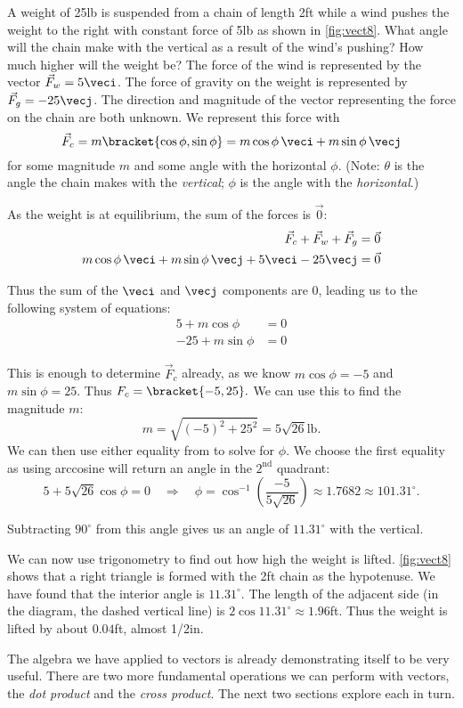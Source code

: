 \begin{example}\label{ex_vect8}
A weight of 25lb is suspended from a chain of length 2ft while a wind pushes the weight to the right with constant force of 5lb as shown in \autoref{fig:vect8}. What angle will the chain make with the vertical as a result of the wind's pushing? How much higher will the weight be?
\solution
The force of the wind is represented by the vector $\vec F_w = 5\veci$. The force of gravity on the weight is represented by $\vec F_g = -25\vecj$. The direction and magnitude of the vector representing the force on the chain are both unknown. We represent this force with
\[\vec F_c = m\bracket{\cos\phi,\sin\phi}= m\cos\phi\, \veci + m\sin\phi\,\vecj\]
for some magnitude $m$ and some angle with the horizontal $\phi$. (Note: $\theta$ is the angle the chain makes with the \emph{vertical}; $\phi$ is the angle with the \emph{horizontal}.)

As the weight is at equilibrium, the sum of the forces is $\vec0$:
\begin{align*}
\vec F_c + \vec F_w + \vec F_g &= \vec 0\\
m\cos\phi\, \veci + m\sin\phi\,\vecj + 5\veci - 25\vecj &=\vec 0
\end{align*}

Thus the sum of the $\veci$ and $\vecj$ components are 0, leading us to the following system of equations:
\begin{align}
5+m\cos\phi &= 0\\
-25+m\sin\phi &= 0
\label{eq:vect8}
\end{align}

This is enough to determine $\vec F_c$ already, as we know $m\cos \phi = -5$ and $m\sin\phi =25$. Thus $F_c =\bracket{-5,25}.$ We can use this to find the magnitude $m$:
\[m = \sqrt{(-5)^2+25^2} = 5\sqrt{26}%
\text{lb}.\]
We can then use either equality from  to solve for $\phi$. We choose the first equality as using arccosine will return an angle in the $2^\text{nd}$ quadrant:
\[5 + 5\sqrt{26}\cos \phi = 0 \quad \Rightarrow \quad \phi = \cos^{-1}\left(\frac{-5}{5\sqrt{26}}\right) \approx 1.7682\approx 101.31^\circ.\]

Subtracting $90^\circ$ from this angle gives us an angle of $11.31^\circ$ with the vertical.

We can now use trigonometry to find out how high the weight is lifted. \autoref{fig:vect8} shows that a right triangle is formed with the 2ft chain as the hypotenuse.  We have found that the interior angle is $11.31^\circ$. The length of the adjacent side (in the diagram, the dashed vertical line) is $2\cos 11.31^\circ \approx 1.96$ft. Thus the weight is lifted by about $0.04$ft, almost 1/2in.
\end{example}

The algebra we have applied to vectors is already demonstrating itself to be very useful. There are two more fundamental operations we can perform with vectors, the \emph{dot product} and the \emph{cross product}. The next two sections explore each in turn.

